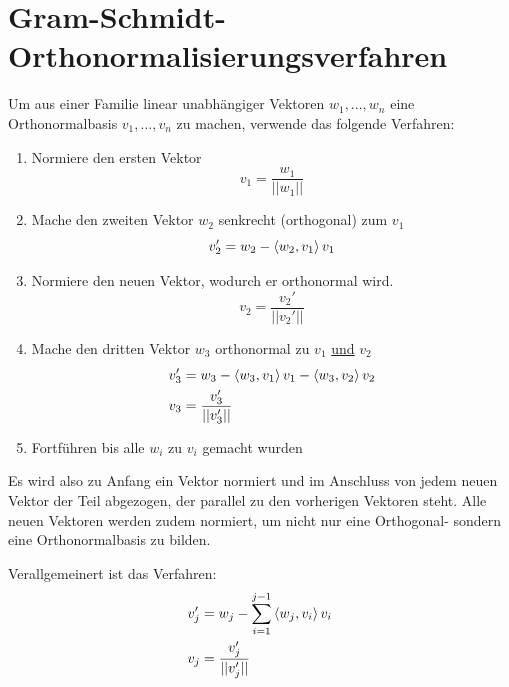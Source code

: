 \documentclass{article}
\begin{document}
\section{Gram-Schmidt-Orthonormalisierungsverfahren}
Um aus einer Familie linear unabhängiger Vektoren $w_1,...,w_n$ eine Orthonormalbasis $v_1,...,v_n$ zu machen, verwende das folgende Verfahren:
\begin{enumerate}
	\item Normiere den ersten Vektor
		$$v_1 = \frac{w_1}{||w_1||}$$

	\item Mache den zweiten Vektor $w_2$ senkrecht (orthogonal) zum $v_1$
		$$v_2' = w_2 - \braket{w_2,v_1} v_1$$

	\item Normiere den neuen Vektor, wodurch er orthonormal wird.
		$$v_2 = \frac{v_2'}{||v_2'||}$$

	\item Mache den dritten Vektor $w_3$ orthonormal zu $v_1$ \underline{und} $v_2$
		\begin{align*}
			v_3' &= w_3 - \braket{w_3,v_1}v_1 - \braket{w_3,v_2}v_2 \\
			v_3 &= \frac{v_3'}{||v_3'||}
		\end{align*}
	
	\item Fortführen bis alle $w_i$ zu $v_i$ gemacht wurden
\end{enumerate}
\textcolor{gruen}{Es wird also zu Anfang ein Vektor normiert und im Anschluss von jedem neuen Vektor der Teil abgezogen, der parallel zu den vorherigen Vektoren steht. Alle neuen Vektoren werden zudem normiert, um nicht nur eine Orthogonal- sondern eine Orthonormalbasis zu bilden.}

Verallgemeinert ist das Verfahren:
	\begin{align}
		v_j' &= w_j - \sum_{i=1}^{j-1} \braket{w_j, v_i} v_i \\
		v_j &= \frac{v_j'}{||v_j'||}
	\end{align}
\end{document}
